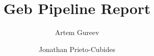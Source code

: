 


\title{Geb Pipeline Report}

\begin{authgrp}
\author{Artem Gureev}
\author{\;Jonathan Prieto-Cubides}
\end{authgrp}